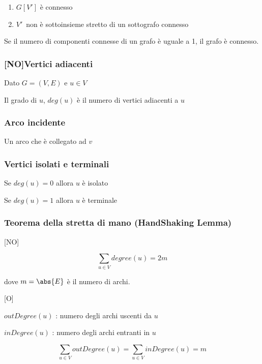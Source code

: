 \documentclass{article}
\providecommand{\tightlist}{%
  \setlength{\itemsep}{0pt}\setlength{\parskip}{0pt}}
\begin{document}
\begin{enumerate}
\tightlist
\item
  {$G[V']$ è connesso}
\item
  $V'${~non è sottoinsieme stretto di un sottografo connesso}
\end{enumerate}

{Se il numero di componenti connesse di un grafo è uguale a 1, }{il
grafo è connesso.}

\subsubsection{{[}NO{]}Vertici adiacenti}

{Dato $G=(V,E)$ e $u \in V$}

{Il grado di $u$, $deg(u)$ è il numero di vertici adiacenti a $u$}

\subsubsection{Arco incidente}

{Un arco che è collegato ad $v$}

\subsubsection{Vertici isolati e terminali}

{Se $deg(u) = 0$ allora $u$ è isolato}

{Se $deg(u) = 1$ allora $u$ è terminale}

\subsubsection{Teorema della stretta di mano (HandShaking Lemma)}

{{[}NO{]}}

\begin{equation}
\sum_{u \in V}{degree(u)} = 2m
\end{equation}

{dove $m = \abs{E}$ è il numero di archi.}

{{[}O{]}}

{$outDegree(u)$ : numero degli archi uscenti da $u$}

{$inDegree(u)$ : numero degli archi entranti in $u$}

\begin{equation}
\sum_{u \in V}{outDegree(u)} = \sum_{u \in V}{inDegree(u)} = m
\end{equation}
\end{document}
